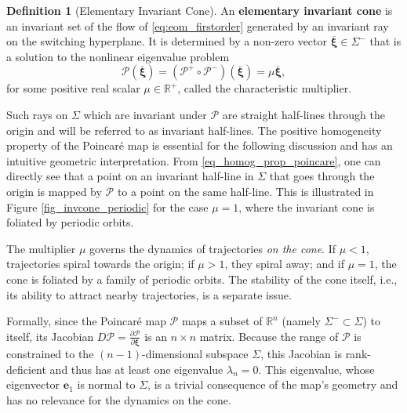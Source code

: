 \documentclass[a4paper,9pt,parskip=half,english]{article}
\theoremstyle{plain}
\theoremstyle{definition}
\newtheorem{definition}{Definition}
\newcommand{\vxi}{\bm{\xi}}
\newcommand{\ve}{\mathbf e}
\newcommand{\cP}{\mathcal{P}}
\begin{document}
\begin{definition}[Elementary Invariant Cone]
	An \textbf{elementary invariant cone} is an invariant set of the flow of \eqref{eq:eom_firstorder} generated by an invariant ray on the switching hyperplane. It is determined by a non-zero vector $\overline{\vxi} \in \Sigma^-$ that is a solution to the nonlinear eigenvalue problem
	\begin{equation}\label{eq_def_invco_poincare}
		\mathcal{P}(\overline{\vxi}) = (\mathcal{P}^+ \circ \mathcal{P}^-)(\overline{\vxi}) = \mu \overline{\vxi},
	\end{equation}
	for some positive real scalar $\mu \in \mathbb{R}^+$, called the characteristic multiplier.
\end{definition}

Such rays on $\Sigma$ which are invariant under $\cP$ are straight half-lines through the origin and will be referred to as invariant half-lines. The positive homogeneity property of the Poincaré map is essential for the following discussion and has an intuitive geometric interpretation. From \eqref{eq_homog_prop_poincare}, one can directly see that a point on an invariant half-line in $\Sigma$ that goes through the origin is mapped by $\mathcal{P}$ to a point on the same half-line. This is illustrated in Figure \ref{fig_invcone_periodic} for the case $\mu = 1$, where the invariant cone is foliated by periodic orbits. 

The multiplier $\mu$ governs the dynamics of trajectories \textit{on the cone}. If $\mu < 1$, trajectories spiral towards the origin; if $\mu > 1$, they spiral away; and if $\mu = 1$, the cone is foliated by a family of periodic orbits. The stability of the cone itself, i.e., its ability to attract nearby trajectories, is a separate issue.

Formally, since the Poincar\'e map $\mathcal{P}$ maps a subset of $\mathbb{R}^n$ (namely $\Sigma^- \subset \Sigma$) to itself, its Jacobian $D\mathcal{P} = \frac{\partial \mathcal{P}}{\partial \vxi}$ is an $n \times n$ matrix. Because the range of $\mathcal{P}$ is constrained to the $(n-1)$-dimensional subspace $\Sigma$, this Jacobian is rank-deficient and thus has at least one eigenvalue $\lambda_n = 0$. This eigenvalue, whose eigenvector $\ve_1$ is normal to $\Sigma$, is a trivial consequence of the map's geometry and has no relevance for the dynamics on the cone.
\end{document}
